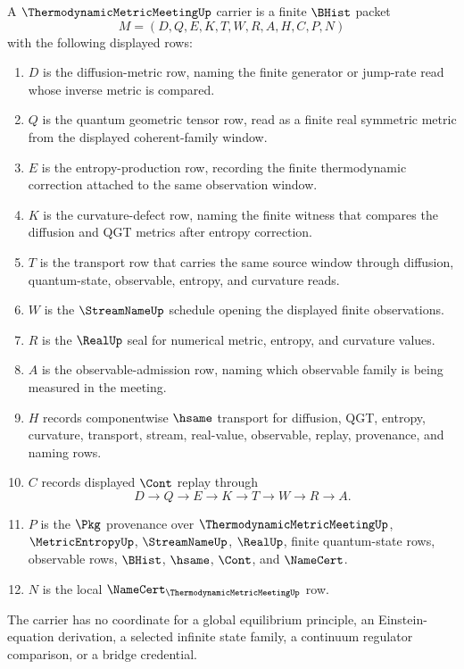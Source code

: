 \begin{definition}
\label{def:thermodynamic-metric-meeting-packet}
A $\ThermodynamicMetricMeetingUp$ carrier is a finite $\BHist$ packet
$$
M=(D,Q,E,K,T,W,R,A,H,C,P,N)
$$
with the following displayed rows:
\begin{enumerate}
\item $D$ is the diffusion-metric row, naming the finite generator or jump-rate read whose inverse metric is compared.
\item $Q$ is the quantum geometric tensor row, read as a finite real symmetric metric from the displayed coherent-family window.
\item $E$ is the entropy-production row, recording the finite thermodynamic correction attached to the same observation window.
\item $K$ is the curvature-defect row, naming the finite witness that compares the diffusion and QGT metrics after entropy correction.
\item $T$ is the transport row that carries the same source window through diffusion, quantum-state, observable, entropy, and curvature reads.
\item $W$ is the $\StreamNameUp$ schedule opening the displayed finite observations.
\item $R$ is the $\RealUp$ seal for numerical metric, entropy, and curvature values.
\item $A$ is the observable-admission row, naming which observable family is being measured in the meeting.
\item $H$ records componentwise $\hsame$ transport for diffusion, QGT, entropy, curvature, transport, stream, real-value, observable, replay, provenance, and naming rows.
\item $C$ records displayed $\Cont$ replay through
$$
D\longrightarrow Q\longrightarrow E\longrightarrow K\longrightarrow T\longrightarrow W\longrightarrow R\longrightarrow A .
$$
\item $P$ is the $\Pkg$ provenance over $\ThermodynamicMetricMeetingUp$, $\MetricEntropyUp$, $\StreamNameUp$, $\RealUp$, finite quantum-state rows, observable rows, $\BHist$, $\hsame$, $\Cont$, and $\NameCert$.
\item $N$ is the local $\NameCert_{\ThermodynamicMetricMeetingUp}$ row.
\end{enumerate}
The carrier has no coordinate for a global equilibrium principle, an Einstein-equation derivation, a selected infinite state family, a continuum regulator comparison, or a bridge credential.
\end{definition}

